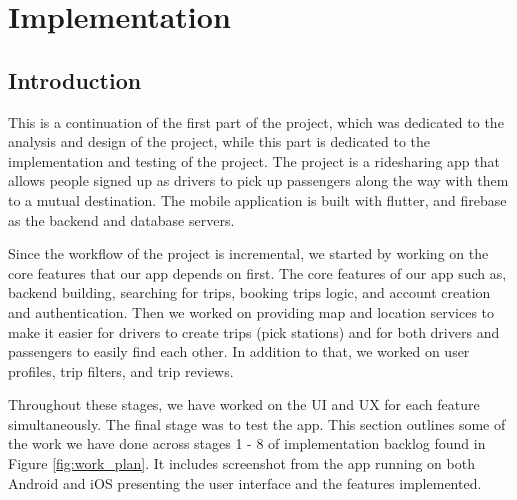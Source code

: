 \documentclass[a4paper, 12pt]{report} %
\begin{document}
    \pagebreak
    \section{Implementation}
        \subsection{Introduction}
            This is a continuation of the first part of the project, which was dedicated to the analysis and design of the project, while this part is dedicated to the implementation and testing of the project. The project is a ridesharing app that allows people signed up as drivers to pick up passengers along the way with them to a mutual destination. The mobile application is built with flutter, and firebase as the backend and database servers.

            Since the workflow of the project is incremental, we started by working on the core features that our app depends on first. The core features of our app such as, backend building, searching for trips, booking trips logic, and account creation and authentication. Then we worked on providing map and location services to make it easier for drivers to create trips (pick stations) and for both drivers and passengers to easily find each other. In addition to that, we worked on user profiles, trip filters, and trip reviews. 
            
            Throughout these stages, we have worked on the UI and UX for each feature simultaneously. The final stage was to test the app. This section outlines some of the work we have done across stages 1 - 8 of implementation backlog found in Figure \ref{fig:work_plan}. It includes screenshot from the app running on both Android and iOS presenting the user interface and the features implemented.

            \pagebreak
\end{document}
